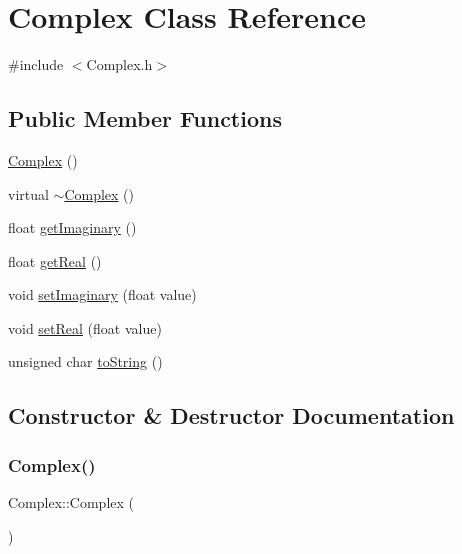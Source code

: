 \hypertarget{class_complex}{}\section{Complex Class Reference}
\label{class_complex}


{\ttfamily \#include $<$Complex.\+h$>$}

\subsection*{Public Member Functions}
\begin{DoxyCompactItemize}
\item 
\mbox{\hyperlink{class_complex_a43b9f07cdf697c71b5fd506a6cc80b8f}{Complex}} ()
\item 
virtual \mbox{\hyperlink{class_complex_a70e14b17c92e3da779686b98f9f3bb2d}{$\sim$\+Complex}} ()
\item 
float \mbox{\hyperlink{class_complex_a26e02af563661f5e4b77380a7d8acbd7}{get\+Imaginary}} ()
\item 
float \mbox{\hyperlink{class_complex_ad0a988b37190381e553616b1f56d29c7}{get\+Real}} ()
\item 
void \mbox{\hyperlink{class_complex_aabdc89fcb379b59ced6aedf12408e3f2}{set\+Imaginary}} (float value)
\item 
void \mbox{\hyperlink{class_complex_a5cc1fcf1428a62c4a775fe4625597fa5}{set\+Real}} (float value)
\item 
unsigned char \mbox{\hyperlink{class_complex_afd4253456f558ed0d1bce5f73af12670}{to\+String}} ()
\end{DoxyCompactItemize}


\subsection{Constructor \& Destructor Documentation}
\mbox{\label{class_complex_a43b9f07cdf697c71b5fd506a6cc80b8f}} 
\subsubsection{\texorpdfstring{Complex()}{Complex()}}
{\footnotesize\ttfamily Complex\+::\+Complex (\begin{DoxyParamCaption}{ }\end{DoxyParamCaption})}

